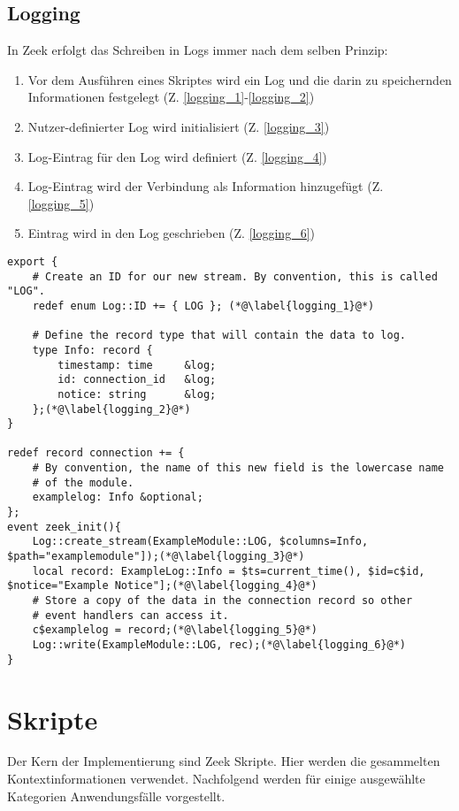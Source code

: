 \subsection{Logging}
In Zeek erfolgt das Schreiben in Logs immer nach dem selben Prinzip:
\begin{enumerate}
\item{Vor dem Ausführen eines Skriptes wird ein Log und die darin zu speichernden Informationen festgelegt (Z. \ref{logging_1}-\ref{logging_2})}
\item{Nutzer-definierter Log wird initialisiert (Z. \ref{logging_3})}
\item{Log-Eintrag für den Log wird definiert (Z. \ref{logging_4})}
\item{Log-Eintrag wird der Verbindung als Information hinzugefügt (Z. \ref{logging_5})}
\item{Eintrag wird in den Log geschrieben (Z. \ref{logging_6})}
\end{enumerate}
\begin{lstlisting}[consecutivenumbers=false,caption={Generierung einer Log-Datei mit Verbindungsinformationen},label={Code_3}]
export {
    # Create an ID for our new stream. By convention, this is called "LOG".
    redef enum Log::ID += { LOG }; (*@\label{logging_1}@*)	

    # Define the record type that will contain the data to log.
    type Info: record {
        timestamp: time		&log;
        id: connection_id	&log; 
        notice: string		&log;
    };(*@\label{logging_2}@*)
}

redef record connection += {
    # By convention, the name of this new field is the lowercase name
    # of the module.
    examplelog: Info &optional;
};
event zeek_init(){
	Log::create_stream(ExampleModule::LOG, $columns=Info, $path="examplemodule"]);(*@\label{logging_3}@*)
	local record: ExampleLog::Info = $ts=current_time(), $id=c$id, $notice="Example Notice"];(*@\label{logging_4}@*)
    # Store a copy of the data in the connection record so other
    # event handlers can access it.
    c$examplelog = record;(*@\label{logging_5}@*)
    Log::write(ExampleModule::LOG, rec);(*@\label{logging_6}@*)
}
\end{lstlisting}
\section{Skripte}
Der Kern der Implementierung sind Zeek Skripte. Hier werden die gesammelten Kontextinformationen verwendet. Nachfolgend werden für einige ausgewählte Kategorien Anwendungsfälle vorgestellt.
